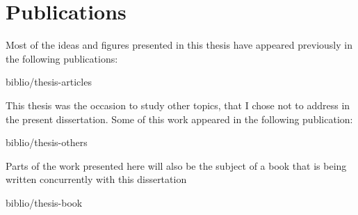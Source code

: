 

\chapter*{Publications} %
\label{p:publications}

Most of the ideas and figures presented in this thesis have appeared previously in the following publications:

\smallskip


\begin{btSect}{biblio/thesis-articles}
\btPrintAll
\end{btSect}

\bigskip

This thesis was the occasion to study other topics, that I chose
not to address in the present dissertation. Some of this work appeared in the following
publication:

\smallskip


\begin{btSect}{biblio/thesis-others}
\btPrintAll
\end{btSect}

\bigskip

Parts of the work presented here will also be the subject of a book that
is being written concurrently with this dissertation

\smallskip


\begin{btSect}{biblio/thesis-book}
\btPrintAll
\end{btSect}
